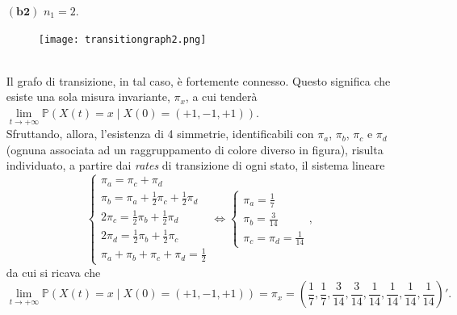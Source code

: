 \documentclass[11pt,largemargins]{homework}
\begin{document}
\begin{alphaparts}
\begin{itemize}
\newpage
   \item[$\left(\textbf{b2}\right)$] $n_{1}=2$. 
 \begin{figure}[htb]\centering
\texttt{[image: transitiongraph2.png]}
  \end{figure}  
  \\
  Il grafo di transizione, in tal caso, è fortemente connesso. Questo significa che esiste una sola misura invariante, $\pi_{x}$, a cui tenderà $\lim\limits_{t \rightarrow +\infty}\mathbb{P}\left(X\left(t\right)=x\mid X\left(0\right)=\left(+1,-1,+1\right)\right).$\\
  Sfruttando, allora, l'esistenza di 4 simmetrie, identificabili con $\pi_{a}$, $\pi_{b}$, $\pi_{c}$ e $\pi_{d}$ (ognuna associata ad un raggruppamento di colore diverso in figura), risulta individuato, a partire dai \emph{rates} di transizione di ogni stato, il sistema lineare 
  \begin{equation*}
  \begin{cases}\pi_{a}=\pi_{c}+\pi_{d}\\
  \pi_{b}=\pi_{a}+\frac{1}{2}\pi_{c}+\frac{1}{2}\pi_{d}\\
  2\pi_{c}=\frac{1}{2}\pi_{b}+\frac{1}{2}\pi_{d}\\
   2\pi_{d}=\frac{1}{2}\pi_{b}+\frac{1}{2}\pi_{c}\\
  \pi_{a}+\pi_{b}+\pi_{c}+\pi_{d}=\frac{1}{2}\end{cases}
  \Leftrightarrow
  \begin{cases}\pi_{a}=\frac{1}{7}\\
  \pi_{b}=\frac{3}{14}\\
  \pi_{c}=\pi_{d}=\frac{1}{14}\end{cases},
  \end{equation*}
  da cui si ricava che
  \begin{equation*}
  \lim\limits_{t \rightarrow +\infty}\mathbb{P}\left(X\left(t\right)=x\mid X\left(0\right)=\left(+1,-1,+1\right)\right)=\pi_{x}=\left(\frac{1}{7},\frac{1}{7},\frac{3}{14},\frac{3}{14},\frac{1}{14},\frac{1}{14},\frac{1}{14},\frac{1}{14}\right)'.
  \end{equation*}
  

\end{itemize}
\end{alphaparts}
\end{document}
